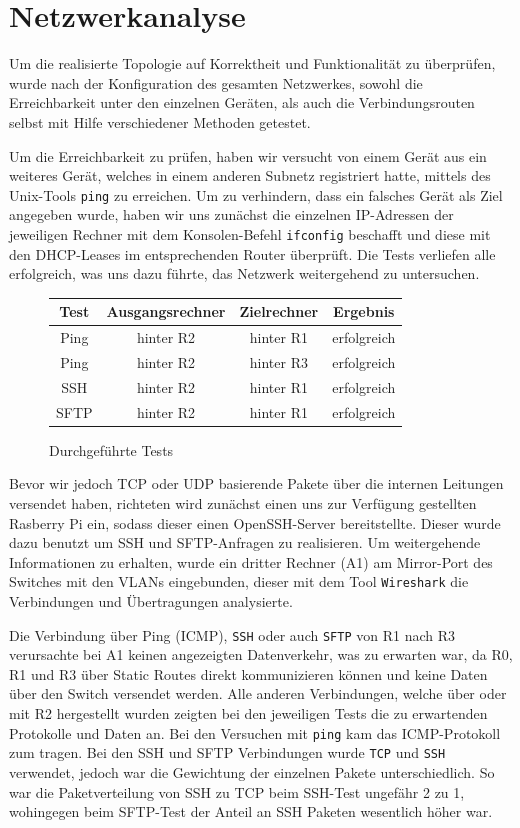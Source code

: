 \documentclass[11pt,a4paper]{article}
\begin{document}
\section{Netzwerkanalyse}
Um die realisierte Topologie auf Korrektheit und Funktionalität zu
überprüfen, wurde nach der Konfiguration des gesamten Netzwerkes,
sowohl die Erreichbarkeit unter den einzelnen Geräten, als auch die
Verbindungsrouten selbst mit Hilfe verschiedener Methoden getestet.
\par
Um die Erreichbarkeit zu prüfen, haben wir versucht von einem Gerät
aus ein weiteres Gerät, welches in einem anderen Subnetz registriert
hatte, mittels des Unix-Tools \texttt{ping} zu erreichen. Um zu
verhindern, dass ein falsches Gerät als Ziel angegeben wurde, haben
wir uns zunächst die einzelnen IP-Adressen der jeweiligen Rechner mit
dem Konsolen-Befehl \texttt{ifconfig} beschafft und diese mit den
DHCP-Leases im entsprechenden Router überprüft. Die Tests verliefen
alle erfolgreich, was uns dazu führte, das Netzwerk weitergehend zu
untersuchen.
\begin{figure}[ht]
\begin{tabular}{|c|c|c|c|}
\hline 
Test & Ausgangsrechner & Zielrechner & Ergebnis \\ 
\hline 
Ping & hinter R2 & hinter R1 & erfolgreich \\ 
\hline 
Ping & hinter R2 & hinter R3 & erfolgreich \\ 
\hline 
SSH & hinter R2 & hinter R1 & erfolgreich \\ 
\hline 
SFTP & hinter R2 & hinter R1 & erfolgreich \\ 
\hline 
\end{tabular} 
  \centering
  \caption{Durchgeführte Tests}
\end{figure}
\par 
Bevor wir jedoch TCP oder UDP basierende Pakete über die internen
Leitungen versendet haben, richteten wird zunächst einen uns zur
Verfügung gestellten Rasberry Pi ein, sodass dieser einen
OpenSSH-Server bereitstellte. Dieser wurde dazu benutzt um SSH und
SFTP-Anfragen zu realisieren. Um weitergehende Informationen zu
erhalten, wurde ein dritter Rechner (A1) am Mirror-Port des Switches
mit den VLANs eingebunden, dieser mit dem Tool \texttt{Wireshark} die
Verbindungen und Übertragungen analysierte.
\par
Die Verbindung über Ping (ICMP), \texttt{SSH} oder auch \texttt{SFTP}
von R1 nach R3 verursachte bei A1 keinen angezeigten Datenverkehr, was
zu erwarten war, da R0, R1 und R3 über Static Routes direkt
kommunizieren können und keine Daten über den Switch versendet werden.
Alle anderen Verbindungen, welche über oder mit R2 hergestellt wurden
zeigten bei den jeweiligen Tests die zu erwartenden Protokolle und
Daten an. Bei den Versuchen mit \texttt{ping} kam das ICMP-Protokoll
zum tragen. Bei den SSH und SFTP Verbindungen wurde \texttt{TCP} und
\texttt{SSH} verwendet, jedoch war die Gewichtung der einzelnen Pakete
unterschiedlich. So war die Paketverteilung von SSH zu TCP beim
SSH-Test ungefähr 2 zu 1, wohingegen beim SFTP-Test der Anteil an SSH
Paketen wesentlich höher war.
\end{document}
